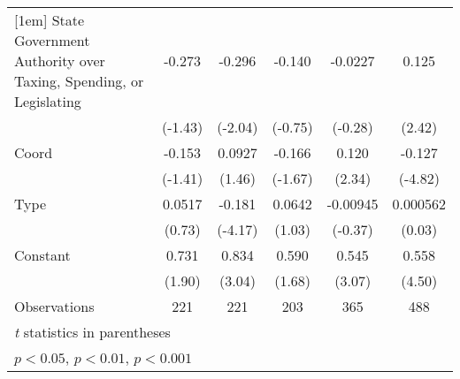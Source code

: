 {\begin{tabular*}{\linewidth}{@{\hskip\tabcolsep\extracolsep\fill}l*{5}{c}}
[1em]
State Government Authority over Taxing, Spending, or Legislating&   -0.273         &   -0.296\sym{*}  &   -0.140         &  -0.0227         &    0.125\sym{*}  \\
                &  (-1.43)         &  (-2.04)         &  (-0.75)         &  (-0.28)         &   (2.42)         \\
[1em]
Coord           &   -0.153         &   0.0927         &   -0.166         &    0.120\sym{*}  &   -0.127\sym{***}\\
                &  (-1.41)         &   (1.46)         &  (-1.67)         &   (2.34)         &  (-4.82)         \\
[1em]
Type            &   0.0517         &   -0.181\sym{***}&   0.0642         & -0.00945         & 0.000562         \\
                &   (0.73)         &  (-4.17)         &   (1.03)         &  (-0.37)         &   (0.03)         \\
[1em]
Constant        &    0.731         &    0.834\sym{**} &    0.590         &    0.545\sym{**} &    0.558\sym{***}\\
                &   (1.90)         &   (3.04)         &   (1.68)         &   (3.07)         &   (4.50)         \\
\hline
Observations    &      221         &      221         &      203         &      365         &      488         \\
\hline\hline
\multicolumn{6}{l}{\footnotesize \textit{t} statistics in parentheses}\\
\multicolumn{6}{l}{\footnotesize \sym{*} \(p<0.05\), \sym{**} \(p<0.01\), \sym{***} \(p<0.001\)}\\
\end{tabular*}
}
